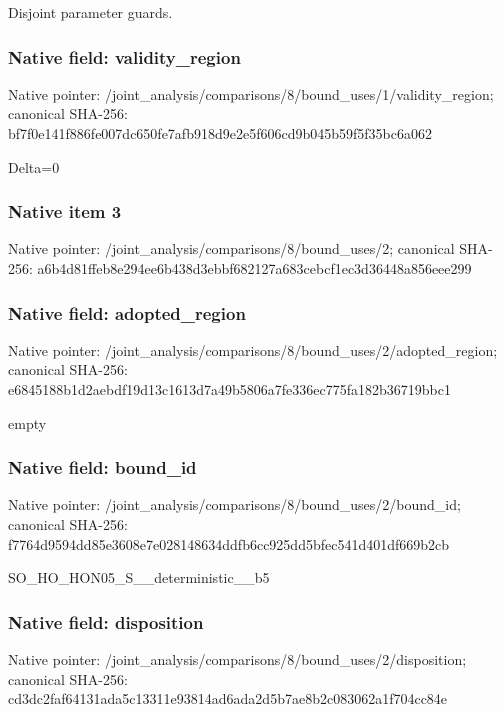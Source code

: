 \documentclass[10pt,a4paper]{article}
\begin{document}
\begingroup\raggedright\sloppy Disjoint parameter guards.\par\endgroup

\subsubsection{Native field: validity\_\allowbreak{}region}
Native pointer: /joint\_\allowbreak{}analysis/comparisons/8/bound\_\allowbreak{}uses/1/validity\_\allowbreak{}region; canonical SHA-256: bf7f0e141f886fe007dc650fe7afb918d9e2e5f606cd9b045b59f5f35bc6a062

\begingroup\raggedright\sloppy Delta=\allowbreak{}0\par\endgroup

\subsubsection{Native item 3}
Native pointer: /joint\_\allowbreak{}analysis/comparisons/8/bound\_\allowbreak{}uses/2; canonical SHA-256: a6b4d81ffeb8e294ee6b438d3ebbf682127a683cebcf1ec3d36448a856eee299

\subsubsection{Native field: adopted\_\allowbreak{}region}
Native pointer: /joint\_\allowbreak{}analysis/comparisons/8/bound\_\allowbreak{}uses/2/adopted\_\allowbreak{}region; canonical SHA-256: e6845188b1d2aebdf19d13c1613d7a49b5806a7fe336ec775fa182b36719bbc1

\begingroup\raggedright\sloppy empty\par\endgroup

\subsubsection{Native field: bound\_\allowbreak{}id}
Native pointer: /joint\_\allowbreak{}analysis/comparisons/8/bound\_\allowbreak{}uses/2/bound\_\allowbreak{}id; canonical SHA-256: f7764d9594dd85e3608e7e028148634ddfb6cc925dd5bfec541d401df669b2cb

\begingroup\raggedright\sloppy SO\_\allowbreak{}HO\_\allowbreak{}HON05\_\allowbreak{}S\_\allowbreak{}\_\allowbreak{}deterministic\_\allowbreak{}\_\allowbreak{}b5\par\endgroup

\subsubsection{Native field: disposition}
Native pointer: /joint\_\allowbreak{}analysis/comparisons/8/bound\_\allowbreak{}uses/2/disposition; canonical SHA-256: cd3dc2faf64131ada5c13311e93814ad6ada2d5b7ae8b2c083062a1f704cc84e
\end{document}
